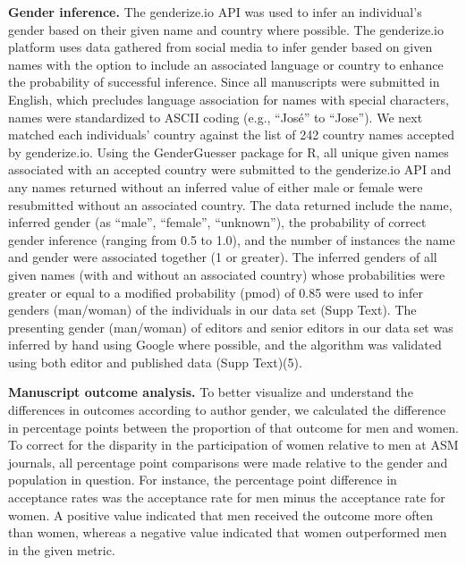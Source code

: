 \documentclass[11pt,]{article}
\begin{document}
\textbf{Gender inference.} The genderize.io API was used to infer an
individual's gender based on their given name and country where
possible. The genderize.io platform uses data gathered from social media
to infer gender based on given names with the option to include an
associated language or country to enhance the probability of successful
inference. Since all manuscripts were submitted in English, which
precludes language association for names with special characters, names
were standardized to ASCII coding (e.g., ``José'' to ``Jose''). We next
matched each individuals' country against the list of 242 country names
accepted by genderize.io. Using the GenderGuesser package for R, all
unique given names associated with an accepted country were submitted to
the genderize.io API and any names returned without an inferred value of
either male or female were resubmitted without an associated country.
The data returned include the name, inferred gender (as ``male'',
``female'', ``unknown''), the probability of correct gender inference
(ranging from 0.5 to 1.0), and the number of instances the name and
gender were associated together (1 or greater). The inferred genders of
all given names (with and without an associated country) whose
probabilities were greater or equal to a modified probability (pmod) of
0.85 were used to infer genders (man/woman) of the individuals in our
data set (Supp Text). The presenting gender (man/woman) of editors and
senior editors in our data set was inferred by hand using Google where
possible, and the algorithm was validated using both editor and
published data (Supp Text)(5).

\textbf{Manuscript outcome analysis.} To better visualize and understand
the differences in outcomes according to author gender, we calculated
the difference in percentage points between the proportion of that
outcome for men and women. To correct for the disparity in the
participation of women relative to men at ASM journals, all percentage
point comparisons were made relative to the gender and population in
question. For instance, the percentage point difference in acceptance
rates was the acceptance rate for men minus the acceptance rate for
women. A positive value indicated that men received the outcome more
often than women, whereas a negative value indicated that women
outperformed men in the given metric.
\end{document}
